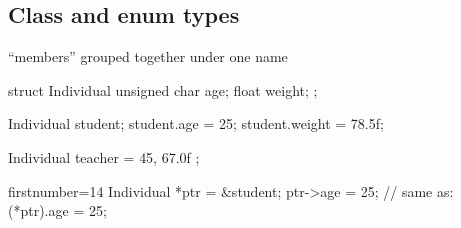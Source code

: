 \subsection[Class/Enum]{Class and enum types}

\begin{frame}[fragile]
  \begin{mdframed}[style=simplebox]
    \center ``members'' grouped together under one name
  \end{mdframed}
  \begin{multicols}{2}
    \begin{cppcode*}{}
      struct Individual {
        unsigned char age;
        float weight;
      };

      Individual student;
      student.age = 25;
      student.weight = 78.5f;

      Individual teacher = {
        45, 67.0f
      };
    \end{cppcode*}
    \columnbreak
    \begin{cppcode*}{firstnumber=14}
      Individual *ptr = &student;
      ptr->age = 25;
      // same as: (*ptr).age = 25;
    \end{cppcode*}
    \pause
    \vfill
    \hspace{-1.5cm}
    \vfill \null
  \end{multicols}
\end{frame}

